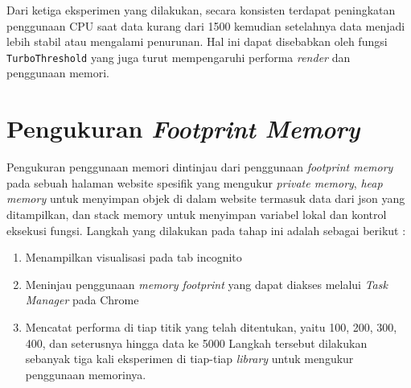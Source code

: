 Dari ketiga eksperimen yang dilakukan, secara konsisten terdapat peningkatan penggunaan CPU saat data kurang dari 1500 kemudian setelahnya data menjadi lebih stabil atau mengalami penurunan. Hal ini dapat disebabkan oleh fungsi \texttt{TurboThreshold} yang juga turut mempengaruhi performa \textit{render} dan penggunaan memori. 


\section{Pengukuran \textit{Footprint Memory}}
Pengukuran penggunaan memori dintinjau dari penggunaan \textit{footprint memory} pada sebuah halaman website spesifik yang mengukur \textit{private memory}, \textit{heap memory} untuk menyimpan objek di dalam website termasuk data dari json yang ditampilkan, dan stack memory untuk menyimpan variabel lokal dan kontrol eksekusi fungsi. Langkah yang dilakukan pada tahap ini adalah sebagai berikut :

\begin{enumerate}
\item Menampilkan visualisasi pada tab incognito 
\item Meninjau penggunaan \textit{memory footprint} yang dapat diakses melalui \textit{Task Manager} pada Chrome
\item Mencatat performa di tiap titik yang telah ditentukan, yaitu 100, 200, 300, 400, dan seterusnya hingga data ke 5000
Langkah tersebut dilakukan sebanyak tiga kali eksperimen di tiap-tiap \textit{library} untuk mengukur penggunaan memorinya.  
\end{enumerate} 
